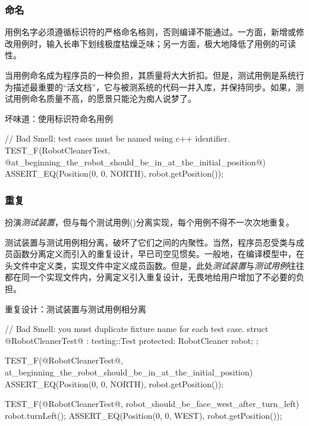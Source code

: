 \begin{content}
\subsubsection{命名}

用例名字必须遵循标识符的严格命名格则，否则编译不能通过。一方面，新增或修改用例时，输入长串下划线极度枯燥乏味；另一方面，极大地降低了用例的可读性。

当用例命名成为程序员的一种负担，其质量将大大折扣。但是，测试用例是系统行为描述最重要的“活文档”，它与被测系统的代码一并入库，并保持同步。如果，测试用例命名质量不高，的愿景只能沦为痴人说梦了。

\begin{nodiff}{坏味道：使用标识符命名用例}
 \begin{c++}
// Bad Smell: test cases must be named using c++ identifier.
TEST_F(RobotCleanerTest, @at_beginning_the_robot_should_be_in_at_the_initial_position@) {
  ASSERT_EQ(Position(0, 0, NORTH), robot.getPosition());
}
 \end{c++}
\end{nodiff}

\subsubsection{重复}

扮演\emph{测试装置}，但与每个测试用例()分离实现，每个用例不得不一次次地重复。

测试装置与测试用例相分离，破坏了它们之间的内聚性。当然，\cpp{}程序员忍受类与成员函数分离定义而引入的重复设计，早已司空见惯矣。一般地，在\cpp{}编译模型中，在头文件中定义类，实现文件中定义成员函数。但是，此处\emph{测试装置}与\emph{测试用例}往往都在同一个实现文件内，分离定义引入重复设计，无畏地给用户增加了不必要的负担。

\begin{nodiff}{重复设计：测试装置与测试用例相分离}
 \begin{c++}
// Bad Smell: you must duplicate fixture name for each test case.
struct @RobotCleanerTest@ : testing::Test {
protected:
  RobotCleaner robot;
};
 
TEST_F(@RobotCleanerTest@, at_beginning_the_robot_should_be_in_at_the_initial_position) {
  ASSERT_EQ(Position(0, 0, NORTH), robot.getPosition());
}
 
TEST_F(@RobotCleanerTest@, robot_should_be_face_west_after_turn_left) {
  robot.turnLeft();
  ASSERT_EQ(Position(0, 0, WEST), robot.getPosition());
}
  \end{c++}
\end{nodiff}


\end{content}
